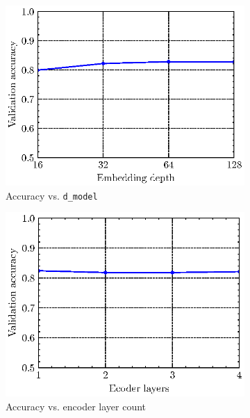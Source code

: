 \begin{figure}
    \centering
    \begin{subfigure}[b]{0.45\textwidth}
        \includegraphics[width=\textwidth]{assets/acc_vs_hyperparam/emb_depth.eps}
        \caption{Accuracy vs. \texttt{d\_model}}
        \label{fig:emd_depth_acc}
    \end{subfigure}
    \hfill
    \begin{subfigure}[b]{0.45\textwidth}
        \includegraphics[width=\textwidth]{assets/acc_vs_hyperparam/enc_layer.eps}
        \caption{Accuracy vs. encoder layer count}
        \label{fig:enc_layer_acc}
    \end{subfigure}
    \vfill
    \begin{subfigure}[b]{0.45\textwidth}

\end{subfigure}
\end{figure}
